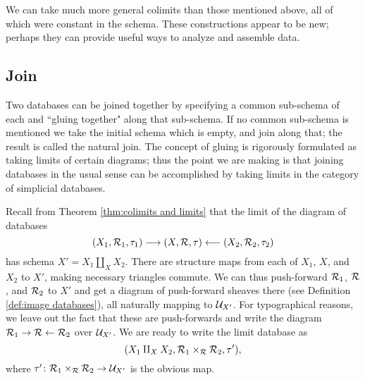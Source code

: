 \documentclass{amsart}
\begin{document}
We can take much more general colimits than those mentioned above, all of which were constant in the schema.  These constructions appear to be new; perhaps they can provide useful ways to analyze and assemble data.

\subsection{Join}\label{subsec:join}

Two databases can be joined together by specifying a common sub-schema of each and ``gluing together" along that sub-schema.  If no common sub-schema is mentioned we take the initial schema which is empty, and join along that; the result is called the natural join.  The concept of gluing is rigorously formulated as taking limits of certain diagrams; thus the point we are making is that joining databases in the usual sense can be accomplished by taking limits in the category of simplicial databases.

Recall from Theorem \ref{thm:colimits and limits} that the limit of the diagram of databases $$(X_1,\mathcal{R}_1,\tau_1)\longrightarrow(X,\mathcal{R},\tau)\longleftarrow(X_2,\mathcal{R}_2,\tau_2)$$ has schema $X'=X_1\amalg_XX_2$.  There are structure maps from each of $X_1$, $X$, and $X_2$ to $X'$, making necessary triangles commute.  We can thus push-forward $\mathcal{R}_1$, $\mathcal{R}$, and $\mathcal{R}_2$ to $X'$ and get a diagram of push-forward sheaves there (see Definition \ref{def:image databases}), all naturally mapping to $\mathcal{U}_{X'}$.  For typographical reasons, we leave out the fact that these are push-forwards and write the diagram $\mathcal{R}_1\rightarrow\mathcal{R}\leftarrow\mathcal{R}_2$ over $\mathcal{U}_{X'}$.  We are ready to write the limit database as $$(X_1\amalg_XX_2,\mathcal{R}_1\times_\mathcal{R}\mathcal{R}_2,\tau'),$$ where $\tau'\colon\mathcal{R}_1\times_\mathcal{R}\mathcal{R}_2\rightarrow\mathcal{U}_{X'}$ is the obvious map.
\end{document}
